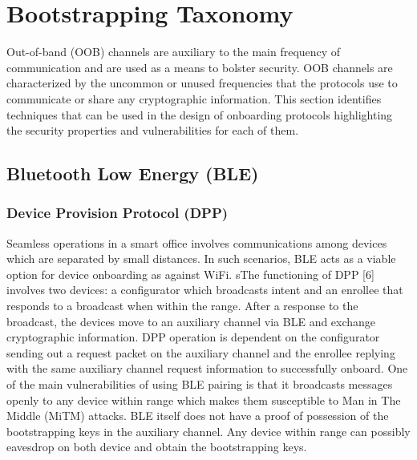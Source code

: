 \section{Bootstrapping Taxonomy}

Out-of-band (OOB) channels are auxiliary to the main frequency of communication and are used as a means to bolster security.
OOB channels are characterized by the uncommon or unused frequencies that the protocols use to communicate or share any cryptographic information.
This section identifies techniques that can be used in the design of onboarding protocols highlighting the security properties and vulnerabilities for each of them. 

\subsection{Bluetooth Low Energy (BLE)}
\subsubsection{Device Provision Protocol (DPP)}
Seamless operations in a smart office involves communications among devices which are separated by small distances.
In such scenarios, BLE acts as a viable option for device onboarding as against WiFi.
sThe functioning of DPP [6] involves two devices: a configurator which broadcasts intent and an enrollee that responds to a broadcast when within the range.
After a response to the broadcast, the devices move to an auxiliary channel via BLE and exchange cryptographic information.
DPP operation is dependent on the configurator sending out a request packet on the auxiliary channel and the enrollee replying with the same auxiliary channel request information to successfully onboard.
One of the main vulnerabilities of using BLE pairing is that it broadcasts messages openly to any device within range which makes them susceptible to Man in The Middle (MiTM) attacks.
BLE itself does not have a proof of possession of the bootstrapping keys in the auxiliary channel.
Any device within range can possibly eavesdrop on both device and obtain the bootstrapping keys.


